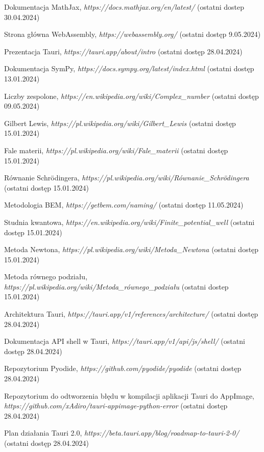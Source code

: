 \documentclass{SGGW-thesis}
\begin{document}
\begin{thebibliography}{9}
	Dokumentacja MathJax,
	\textit{https://docs.mathjax.org/en/latest/}
	(ostatni dostep 30.04.2024)
	
	Strona główna WebAssembly,
	\textit{https://webassembly.org/}
	(ostatni dostęp 9.05.2024)
	
	Prezentacja Tauri, 
	\textit{https://tauri.app/about/intro}
	(ostatni dostęp 28.04.2024)
	
	Dokumentacja SymPy, 
	\textit{https://docs.sympy.org/latest/index.html}
	(ostatni dostęp 13.01.2024)
	
	Liczby zespolone,
	\textit{https://en.wikipedia.org/wiki/Complex\_number}
	(ostatni dostęp 09.05.2024)
	
	Gilbert Lewis, 
	\textit{https://pl.wikipedia.org/wiki/Gilbert\_Lewis}
	(ostatni dostęp 15.01.2024)
	
	Fale materii, 
	\textit{https://pl.wikipedia.org/wiki/Fale\_materii}
	(ostatni dostęp 15.01.2024)
	
	Równanie Schrödingera, 
	\textit{https://pl.wikipedia.org/wiki/Równanie\_Schrödingera}
	(ostatni dostęp 15.01.2024)
	
	Metodologia BEM,
	\textit{https://getbem.com/naming/}
	(ostatni dostęp 11.05.2024)
	
	Studnia kwantowa, 
	\textit{https://en.wikipedia.org/wiki/Finite\_potential\_well}
	(ostatni dostęp 15.01.2024)
	
	Metoda Newtona, 
	\textit{https://pl.wikipedia.org/wiki/Metoda\_Newtona}
	(ostatni dostęp 15.01.2024) 
	
	Metoda równego podziału, 
	\textit{https://pl.wikipedia.org/wiki/Metoda\_równego\_podziału}
	(ostatni dostep 15.01.2024)
	
	Architektura Tauri, 
	\textit{https://tauri.app/v1/references/architecture/}
	(ostatni dostęp 28.04.2024)
	
	Dokumentacja API shell w Tauri, 
	\textit{https://tauri.app/v1/api/js/shell/}
	(ostatni dostęp 28.04.2024)

	
	Repozytorium Pyodide, 
	\textit{https://github.com/pyodide/pyodide}
	(ostatni dostęp 28.04.2024)
	
	Repozytorium do odtworzenia błędu w kompilacji aplikacji Tauri do AppImage, 
	\textit{https://github.com/xAdiro/tauri-appimage-python-error}
	(ostatni dostęp 28.04.2024)
	
	Plan działania Tauri 2.0, 
	\textit{https://beta.tauri.app/blog/roadmap-to-tauri-2-0/}
	(ostatni dostęp 28.04.2024)
	
	
	
	
	
	
	
	
	
\end{thebibliography}

\beforelastpage
\end{document}
